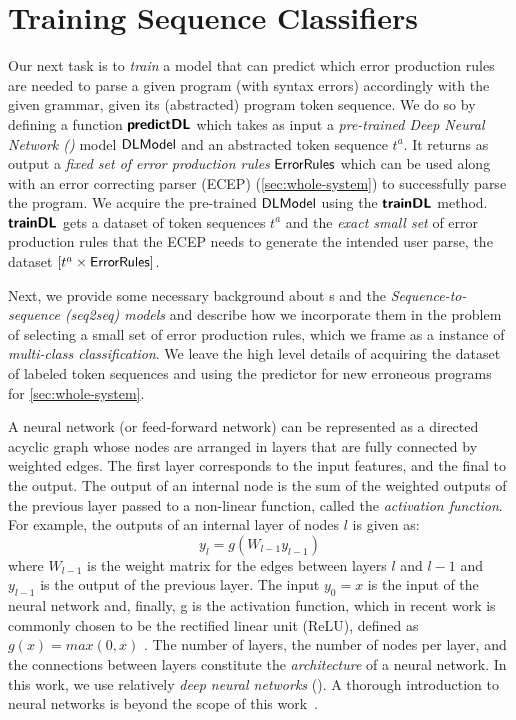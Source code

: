 \section{Training Sequence Classifiers}
\label{sec:seq-classifiers}

Our next task is to \emph{train} a model that can predict which error production
rules are needed to parse a given program (with syntax errors) accordingly with
the given grammar, given its (abstracted) program token sequence.
%
We do so by defining a function $\bm{\mathsf{predictDL}}$ which takes as input a
\emph{pre-trained Deep Neural Network (\dnn)} model $\mathsf{DLModel}$ and an abstracted
token sequence $t^a$.
%
It returns as output a \emph{fixed set of error production rules}
$\mathsf{ErrorRules}$ which can be used along with an error correcting parser (ECEP)
(\autoref{sec:whole-system}) to successfully parse the program.
%
We acquire the pre-trained $\mathsf{DLModel}$ using the $\bm{\mathsf{trainDL}}$ method.
$\bm{\mathsf{trainDL}}$ gets a dataset of token sequences $t^a$ and the \emph{exact small
set} of error production rules that the ECEP needs to generate the intended user
parse, \ie the dataset $[t^a \times \mathsf{ErrorRules}]$.

Next, we provide some necessary background about \dnn{}s and the
\emph{Sequence-to-sequence (seq2seq) models} and describe how we incorporate
them in the problem of selecting a small set of error production rules, which we
frame as a instance of \emph{multi-class classification}. We leave the high
level details of acquiring the dataset of labeled token sequences and using the
predictor for new erroneous programs for \autoref{sec:whole-system}.

A neural network (or feed-forward network) can be represented as a directed
acyclic graph whose nodes are arranged in layers that are fully connected by
weighted edges. The first layer corresponds to the input features, and the final
to the output. The output of an internal node is the sum of the weighted outputs
of the previous layer passed to a non-linear function, called the
\emph{activation function}. For example, the outputs of an internal layer of
nodes $l$ is given as:
\begin{equation*}
    y_l = g(W_{l-1} y_{l-1})
\end{equation*}
where $W_{l-1}$ is the weight matrix for the edges between layers $l$ and $l-1$
and $y_{l-1}$ is the output of the previous layer. The input $y_0 = x$ is the
input of the neural network and, finally, g is the activation function, which in
recent work is commonly chosen to be the rectified linear unit (ReLU), defined
as $g(x) = max(0, x)$ \citep{Nair2010-xg}.  The number of layers, the number of
nodes per layer, and the connections between layers constitute the
\emph{architecture} of a neural network. In this work, we use relatively
\emph{deep neural networks} (\dnn). A thorough introduction to neural networks
is beyond the scope of this work~\citep{Hastie2009-bn, Nielsen2015-pu}.



